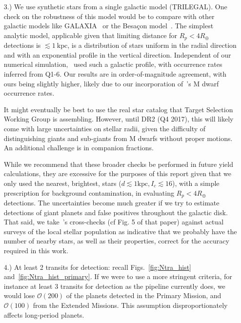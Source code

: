 \begin{itemize}
	
	\item [3.) We use synthetic stars from a single galactic model (TRILEGAL).]
	One check on the robustness of this model would be to compare with other galactic models like GALAXIA~\citep{sharma_galaxia_2011} or the Besa\c con model~\citep{robin2003synthetic}.
	The simplest analytic model, applicable given that \tesss limiting distance for $R_p<4R_\oplus$ detections is $\lesssim 1\ \mathrm{kpc}$, is a distribution of stars uniform in the radial direction and with an exponential profile in the vertical direction. 
	Independent of our numerical simulation,~\citet{winn_searchable_2013} used such a galactic profile, with occurrence rates inferred from \kepler Q1-6. Our results are in order-of-magnitude agreement, with ours being slightly higher, likely due to our incorporation of~\citet{dressing_occurrence_2015}'s M dwarf occurrence rates.
	
	It might eventually be best to use the real star catalog that \tesss Target Selection Working Group is assembling. However, until \gaia DR2 (Q4 2017), this will likely come with large uncertainties on stellar radii, given the difficulty of distinguishing giants and sub-giants from M dwarfs without proper motions.
	An additional challenge is in companion fractions.
	
	While we recommend that these broader checks be performed in future \tess yield calculations, they are excessive for the purposes of this report given that we only used the nearest, brightest, stars ($d\lesssim\mathrm{1kpc}, I_c\lesssim16$), with a simple prescription for background contamination, in evaluating \tesss $R_p<4R_\oplus$ detections.
	The uncertainties become much greater if we try to estimate detections of giant planets and false positives throughout the galactic disk.
	That said, we take~'s cross-checks (cf Fig. 5 of that paper) against actual surveys of the local stellar population as indicative that we probably have the number of nearby stars, as well as their properties, correct for the accuracy required in this work.
	
	\item [4.) At least 2 transits for detection:] recall Figs.~\ref{fig:Ntra_hist} and~\ref{fig:Ntra_hist_primary}.
	If we were to use a more stringent criteria, for instance at least 3 transits for detection as the \kepler pipeline currently does, we would lose $\mathcal{O}(200)$ of the planets detected in the Primary Mission, and $\mathcal{O}(100)$ from the Extended Missions.
	This assumption disproportionately affects long-period planets.
	

\end{itemize}
